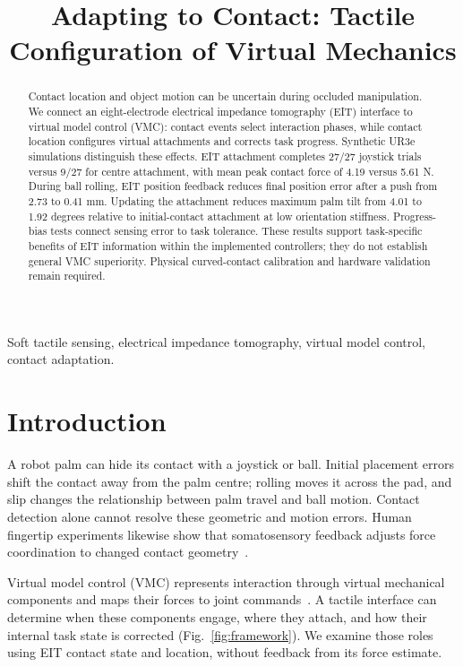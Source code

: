 \documentclass[letterpaper,10pt,conference]{IEEEtran}
\title{Adapting to Contact: Tactile Configuration of Virtual Mechanics}
\author{\IEEEauthorblockN{Anonymous authors}}
\begin{document}
\maketitle
\begin{abstract}
Contact location and object motion can be uncertain during occluded manipulation. We connect an eight-electrode electrical impedance tomography (EIT) interface to virtual model control (VMC): contact events select interaction phases, while contact location configures virtual attachments and corrects task progress. Synthetic UR3e simulations distinguish these effects. EIT attachment completes 27/27 joystick trials versus 9/27 for centre attachment, with mean peak contact force of 4.19 versus 5.61 N. During ball rolling, EIT position feedback reduces final position error after a push from 2.73 to 0.41 mm. Updating the attachment reduces maximum palm tilt from 4.01 to 1.92 degrees relative to initial-contact attachment at low orientation stiffness. Progress-bias tests connect sensing error to task tolerance. These results support task-specific benefits of EIT information within the implemented controllers; they do not establish general VMC superiority. Physical curved-contact calibration and hardware validation remain required.
\end{abstract}
\begin{IEEEkeywords}
Soft tactile sensing, electrical impedance tomography, virtual model control, contact adaptation.
\end{IEEEkeywords}

\section{Introduction}
A robot palm can hide its contact with a joystick or ball. Initial placement errors shift the contact away from the palm centre; rolling moves it across the pad, and slip changes the relationship between palm travel and ball motion. Contact detection alone cannot resolve these geometric and motion errors. Human fingertip experiments likewise show that somatosensory feedback adjusts force coordination to changed contact geometry~\cite{jenmalm}.

Virtual model control (VMC) represents interaction through virtual mechanical components and maps their forces to joint commands~\cite{pratt}. A tactile interface can determine when these components engage, where they attach, and how their internal task state is corrected (Fig.~\ref{fig:framework}). We examine those roles using EIT contact state and location, without feedback from its force estimate.
\end{document}
